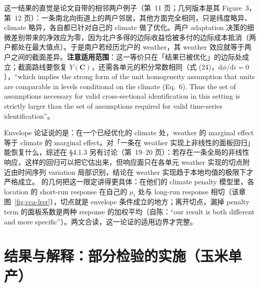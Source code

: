这一结果的直觉是论文自带的相邻两户例子（第~11 页；几何版本是其 Figure~3，第~12 页）：一条南北向街道上的两户邻居，其他方面完全相同，只是纬度略异、climate 略异，各自都已针对自己的 climate 做了优化。两户 adaptation 决策的细微差别带来的净效应为零，因为北户多得的边际收益恰被多付的边际成本抵消（两户都处在最大值点）。于是南户若经历北户的 weather，其 weather 效应就等于两户之间的截面差异。\textbf{注意适用范围}：这一等价只在「结果已被优化」的边际处成立；截面路线要恢复 $Y(\mathbf{C})$，还需各单元的积分常数相同（式 (24)，$\mathrm{d}\phi/\mathrm{d}i=0$），``which implies the strong form of the unit homogeneity assumption that units are comparable in levels conditional on the climate (Eq.~6). Thus the set of assumptions necessary for valid cross-sectional identification in this setting is strictly larger than the set of assumptions required for valid time-series identification''\citep[第~14 页]{hsiang2016climate}。

\begin{intuition}
Envelope 论证说的是：在一个已经优化的 climate 处，weather 的 marginal effect 等于 climate 的 marginal effect。对「一条在 weather 实现上非线性的面板回归」能恢复什么，综述在 \S 4.1.3 另有讨论（第~19--20 页）：若存在一条全局的非线性响应，这样的回归可以把它估出来，但响应面只在各单元 weather 实现的切点附近由时间序列 variation 局部识别，结论在 weather 实现趋于本地均值的极限下才严格成立。 的几何把这一限定讲得更具体：在他们的 climate penalty 模型里，各 location 的 short-run response 在自己的 $\mu_i$ 处与 long-run response 相切（该章图~\ref{fig:cca-lrsr}），切点就是 envelope 条件成立的地方；离开切点，漏掉 penalty term 的面板系数是两种 response 的加权平均（自陈：``our result is both different and more specific''\citep[第~1217 页]{merel2021climate}）。两文合读，这一论证的适用边界才完整。
\end{intuition}

\section{结果与解释：部分检验的实施（玉米单产）}

